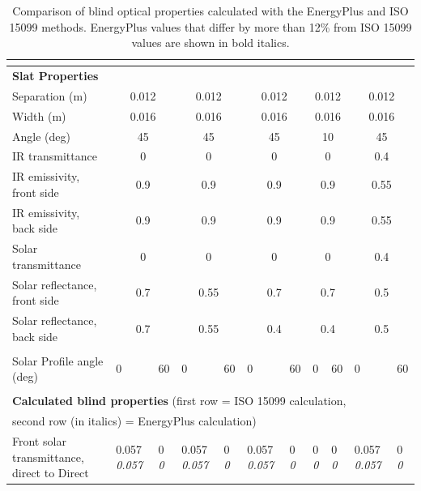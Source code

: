 \begin{longtable}[c]{p{1.0in}p{0.4in}p{0.4in}p{0.4in}p{0.4in}p{0.4in}p{0.4in}p{0.4in}p{0.4in}p{0.4in}p{0.4in}}
\caption{Comparison of blind optical properties calculated with the EnergyPlus and ISO 15099 methods. EnergyPlus values that differ by more than 12\% from ISO 15099 values are shown in bold italics.}\tabularnewline
\label{table:comparison-of-blind-optical-properties}\tabularnewline
\toprule 
\multicolumn{11}{l}{\textbf{Slat Properties}} \tabularnewline \midrule
Separation (m) & \multicolumn{2}{c}{0.012} & \multicolumn{2}{c}{0.012} & \multicolumn{2}{c}{0.012} & \multicolumn{2}{c}{0.012} & \multicolumn{2}{c}{0.012} \tabularnewline \midrule
Width (m) & \multicolumn{2}{c}{0.016} & \multicolumn{2}{c}{0.016} & \multicolumn{2}{c}{0.016} & \multicolumn{2}{c}{0.016} & \multicolumn{2}{c}{0.016} \tabularnewline \midrule
Angle (deg) & \multicolumn{2}{c}{45} & \multicolumn{2}{c}{45} & \multicolumn{2}{c}{45} & \multicolumn{2}{c}{10} & \multicolumn{2}{c}{45} \tabularnewline \midrule
IR transmittance & \multicolumn{2}{c}{0} & \multicolumn{2}{c}{0} & \multicolumn{2}{c}{0} & \multicolumn{2}{c}{0} & \multicolumn{2}{c}{0.4} \tabularnewline \midrule
IR emissivity, front side & \multicolumn{2}{c}{0.9} & \multicolumn{2}{c}{0.9} & \multicolumn{2}{c}{0.9} & \multicolumn{2}{c}{0.9} & \multicolumn{2}{c}{0.55} \tabularnewline \midrule
IR emissivity, back side & \multicolumn{2}{c}{0.9} & \multicolumn{2}{c}{0.9} & \multicolumn{2}{c}{0.9} & \multicolumn{2}{c}{0.9} & \multicolumn{2}{c}{0.55} \tabularnewline \midrule
Solar transmittance & \multicolumn{2}{c}{0} & \multicolumn{2}{c}{0} & \multicolumn{2}{c}{0} & \multicolumn{2}{c}{0} & \multicolumn{2}{c}{0.4} \tabularnewline \midrule
Solar reflectance, front side & \multicolumn{2}{c}{0.7} & \multicolumn{2}{c}{0.55} & \multicolumn{2}{c}{0.7} & \multicolumn{2}{c}{0.7} & \multicolumn{2}{c}{0.5} \tabularnewline \midrule
Solar reflectance, back side & \multicolumn{2}{c}{0.7} & \multicolumn{2}{c}{0.55} & \multicolumn{2}{c}{0.4} & \multicolumn{2}{c}{0.4} & \multicolumn{2}{c}{0.5} \tabularnewline \midrule
 \tabularnewline \midrule
Solar Profile angle (deg) & 0 & 60 & 0 & 60 & 0 & 60 & 0 & 60 & 0 & 60 \tabularnewline \midrule
 \tabularnewline \midrule
\multicolumn{11}{l}{\textbf{Calculated blind properties} (first row = ISO 15099 calculation,} \tabularnewline
\multicolumn{11}{l}{second row (in italics) = EnergyPlus calculation)} \tabularnewline \midrule
Front solar transmittance, direct to Direct & 0.057 \quad \quad \textit{0.057} & 0 \quad \quad \textit{0} & 0.057 \quad \quad \textit{0.057} & 0 \quad \quad \textit{0} & 0.057 \quad \quad \textit{0.057} & 0 \quad \quad \textit{0} & 0 \quad \quad \textit{0} & 0 \quad \quad \textit{0} & 0.057 \quad \quad \textit{0.057} & 0 \quad \quad \textit{0} \tabularnewline \midrule

\end{longtable}

